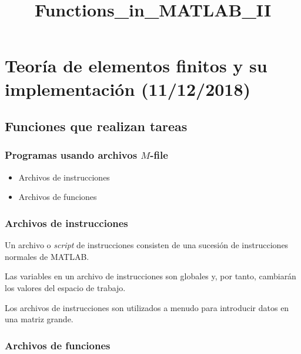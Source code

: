 \documentclass[11pt]{article}
\title{Functions\_in\_MATLAB\_II}
\providecommand{\tightlist}{%
      \setlength{\itemsep}{0pt}\setlength{\parskip}{0pt}}
\begin{document}
    
    
    \maketitle
    
    

    
    \hypertarget{teoruxeda-de-elementos-finitos-y-su-implementaciuxf3n-11122018}{%
\section{Teoría de elementos finitos y su implementación
(11/12/2018)}\label{teoruxeda-de-elementos-finitos-y-su-implementaciuxf3n-11122018}}

\hypertarget{funciones-que-realizan-tareas}{%
\subsection{Funciones que realizan
tareas}\label{funciones-que-realizan-tareas}}

\hypertarget{programas-usando-archivos-m-file}{%
\subsubsection{\texorpdfstring{Programas usando archivos
\(M\)-file}{Programas usando archivos M-file}}\label{programas-usando-archivos-m-file}}

\begin{itemize}
\tightlist
\item
  Archivos de instrucciones
\item
  Archivos de funciones
\end{itemize}

    \hypertarget{archivos-de-instrucciones}{%
\subsubsection{Archivos de
instrucciones}\label{archivos-de-instrucciones}}

Un archivo o \emph{script} de instrucciones consisten de una sucesión de
instrucciones normales de MATLAB.

Las variables en un archivo de instrucciones son globales y, por tanto,
cambiarán los valores del espacio de trabajo.

Los archivos de instrucciones son utilizados a menudo para introducir
datos en una matriz grande.

    \hypertarget{archivos-de-funciones}{%
\subsubsection{Archivos de funciones}\label{archivos-de-funciones}}
\end{document}
